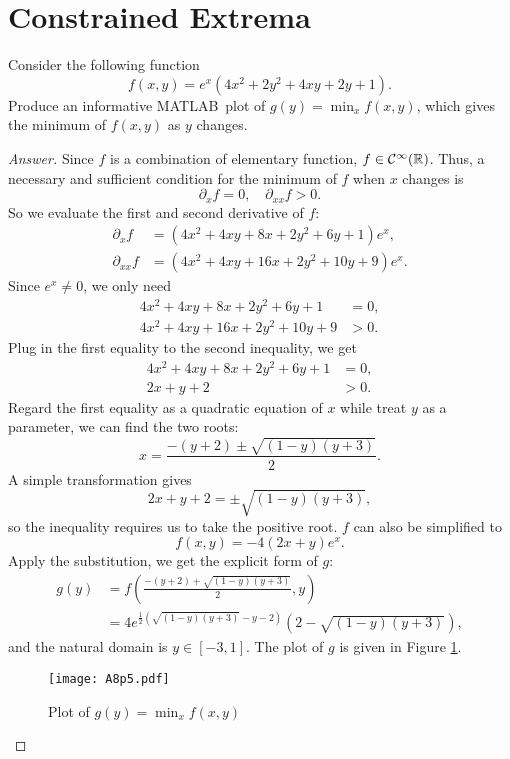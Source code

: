 \section{Constrained Extrema}
Consider the following function
\[ f(x,y) = e^x\left(4x^2 + 2y^2 + 4xy + 2y + 1\right). \]
Produce an informative MATLAB\texttrademark\ plot of \(g(y) = \min_{x} f(x, y)\), which gives the minimum of \(f(x,y)\) as \(y\) changes.
\begin{proof}[Answer]
	Since \(f\) is a combination of elementary function, \(f\in\mathcal{C}^\infty(\mathbb{R})\).
	Thus, a necessary and sufficient condition for the minimum of \(f\) when \(x\) changes is
	\[ \partial_x f=0, \quad \partial_{xx}f>0. \]
	So we evaluate the first and second derivative of \(f\):
	\begin{align*}
	\partial_x f&=\left(4 x^2+4 x y+8 x+2 y^2+6 y+1\right)e^x, \\
	\partial_{xx} f&=\left(4 x^2+4 x y+16 x+2 y^2+10 y+9\right)e^x.
	\end{align*}
	Since \(e^x\neq0\), we only need
	\begin{align*}
	4 x^2+4 x y+8 x+2 y^2+6 y+1&=0, \\
	4 x^2+4 x y+16 x+2 y^2+10 y+9&>0.
	\end{align*}
	Plug in the first equality to the second inequality, we get
	\begin{align*}
	4 x^2+4 x y+8 x+2 y^2+6 y+1&=0, \\
	2 x+ y+ 2&>0.
	\end{align*}
	Regard the first equality as a quadratic equation of \(x\) while treat \(y\) as a parameter, we can find the two roots:
	\[ x=\frac{-(y+2)\pm\sqrt{(1-y)(y+3)}}{2}. \]
	A simple transformation gives
	\[ 2x+y+2=\pm\sqrt{(1-y)(y+3)}, \]
	so the inequality requires us to take the positive root.
	\(f\) can also be simplified to
	\[ f(x,y)= -4(2x+y) e^x. \]
	Apply the substitution, we get the explicit form of \(g\):
	\begin{align*}
	 g(y)&=f\left(\frac{-(y+2)+\sqrt{(1-y)(y+3)}}{2}, y\right)\\
	 &=4 e^{\frac{1}{2} \left(\sqrt{(1-y) (y+3)}-y-2\right)} \left(2-\sqrt{(1-y) (y+3)}\right),
	\end{align*}
	and the natural domain is \(y\in[-3,1]\).
	The plot of \(g\) is given in Figure \ref{mathematica}.
	\begin{figure}[htbp]
		\centering
		\texttt{[image: A8p5.pdf]}
		\caption{Plot of \(g(y) = \min_{x} f(x, y)\)}
		\label{mathematica}
	\end{figure}
\end{proof}
